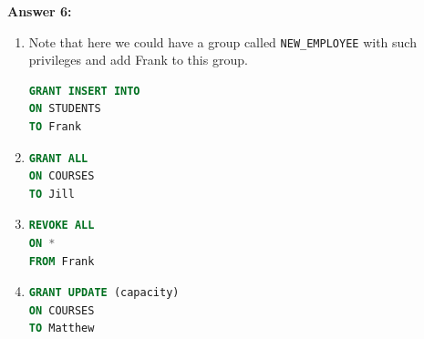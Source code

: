 \documentclass[12pt,reqno]{amsart}
\newcommand{\code}[1]{\texttt{#1}}
\begin{document}
\textbf{Answer 6:}
\begin{enumerate}[label=\alph*.]
	\item Note that here we could have a group called \code{NEW\_EMPLOYEE} with such privileges and add Frank to this group.
	\begin{lstlisting}[language=sql]
GRANT INSERT INTO
ON STUDENTS
TO Frank
	\end{lstlisting}
	\item 
	\begin{lstlisting}[language=sql]
GRANT ALL
ON COURSES
TO Jill
	\end{lstlisting}
	\item
	\begin{lstlisting}[language=sql]
REVOKE ALL
ON *
FROM Frank
	\end{lstlisting}
	\item
	\begin{lstlisting}[language=sql]
GRANT UPDATE (capacity)
ON COURSES
TO Matthew
	\end{lstlisting}
\end{enumerate}
\end{document}
